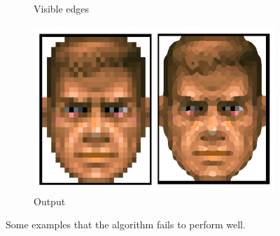\documentclass{article}
\begin{document}
\begin{figure}[h!]
\begin{subfigure}[b]{0.4\textwidth}
        \caption{Visible edges}
        \label{f2}
    \end{subfigure}
    \begin{subfigure}[b]{0.6\textwidth}
        \includegraphics[width=\textwidth]{f3}
        \caption{Output}
        \label{f3}
    \end{subfigure}
    \caption{ Some examples that the algorithm fails to perform well.}
    \label{fail}
\end{figure}



\end{document}
